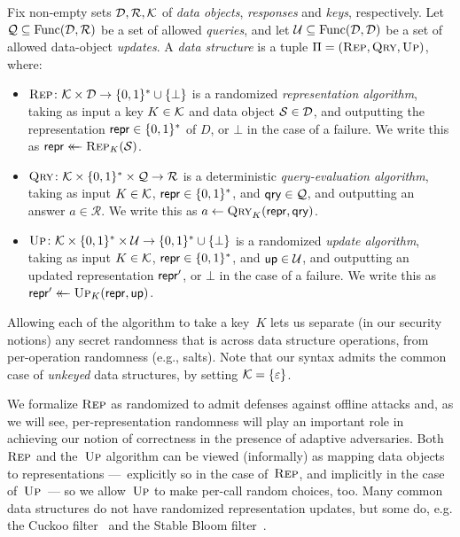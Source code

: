 
Fix non-empty sets $\mathcal{D}, \mathcal{R}, \mathcal{K}$ of \emph{data objects}, \emph{responses} and \emph{keys}, respectively.  Let $\mathcal{Q}\subseteq \mathrm{Func}(\mathcal{D},\mathcal{R})$ be a set of allowed \emph{queries}, and let
$\mathcal{U} \subseteq \mathrm{Func}(\mathcal{D},\mathcal{D})$ be a set of allowed data-object \emph{updates}. 
A {\em data structure} is a tuple $\Pi = (\textsc{Rep},\textsc{Qry},\textsc{Up})$, where:

\begin{itemize}
  \item $\textsc{Rep}\colon \mathcal{K} \times \mathcal{D} \to \{0,1\}^* \cup \{\bot\}$ is a randomized {\em representation algorithm}, taking as input a key $K \in \mathcal{K}$ and data object $\mathcal{S} \in \mathcal{D}$, and outputting the representation $\mathsf{repr} \in \{0,1\}^*$ of $D$, or $\bot$ in the case of a failure. We write this as $\mathsf{repr} \mathrel{\leftarrow\mkern-14mu\leftarrow} \textsc{Rep}_K(\mathcal{S})$.
%
  \item $\textsc{Qry}\colon \mathcal{K} \times \{0,1\}^* \times \mathcal{Q} \to \mathcal{R}$ is a deterministic {\em query-evaluation algorithm}, taking as input $K \in \mathcal{K}$, $\mathsf{repr} \in \{0,1\}^*$, and $\mathsf{qry} \in \mathcal{Q}$, and outputting an answer $a \in \mathcal{R}$. We write this as $a \gets \textsc{Qry}_K(\mathsf{repr},\mathsf{qry})$.
%
  \item $\textsc{Up}\colon \mathcal{K} \times \{0,1\}^* \times \mathcal{U} \to \{0,1\}^* \cup \{\bot\}$ is a randomized {\em update algorithm}, taking as input $K \in \mathcal{K}$, $\mathsf{repr} \in \{0,1\}^*$, and $\mathsf{up} \in \mathcal{U}$, and outputting an updated representation $\mathsf{repr}'$, or $\bot$ in the case of a failure. We write this as $\mathsf{repr}' \mathrel{\leftarrow\mkern-14mu\leftarrow} \textsc{Up}_K(\mathsf{repr},\mathsf{up})$.
\end{itemize}

Allowing each of the algorithm to take a key~$K$ lets us separate (in our security notions) any secret randomness that is across data structure operations, from per-operation randomness (e.g., salts).  Note that our syntax admits the common case of \emph{unkeyed} data structures, by setting $\mathcal{K}=\{\varepsilon\}$.  

We formalize $\textsc{Rep}$ as randomized to admit defenses against offline attacks and, as we will see, per-representation randomness will play an important role in achieving our notion of correctness in the presence of adaptive adversaries.  Both~$\textsc{Rep}$ and the~$\textsc{Up}$ algorithm can be viewed (informally) as mapping data objects to representations ---~explicitly so in the case of~$\textsc{Rep}$, and implicitly in the case of~$\textsc{Up}$~--- so we allow~$\textsc{Up}$ to make per-call random choices, too.  Many common data structures do not have randomized representation updates, but some do, e.g. the Cuckoo filter~\cite{xxx} and the Stable Bloom filter~\cite{xxx}.

